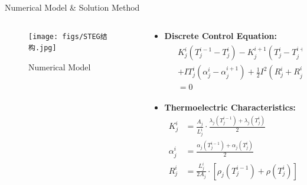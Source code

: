 \documentclass{beamer}
\begin{document}
\begin{frame}{Numerical Model \& Solution Method}
    \begin{columns}
        \begin{column}{.35\textwidth}
            \vfill
            \begin{figure}
                \texttt{[image: figs/STEG结构.jpg]}
                \caption{Numerical Model}
                \label{fig4}
            \end{figure}
        \end{column}
        
        \begin{column}{.7\textwidth}
            \begin{itemize}
                \item \textbf{Discrete Control Equation:}
                {\small
                \begin{align}
                    \begin{aligned}
                        &K_j^i\left( {T_j^{i - 1} - T_j^i} \right) 
                        - K_j^{i + 1}\left( {T_j^i - T_j^{i + 1}} \right) \\ 
                        &+ IT_j^i\left( {\alpha _j^i - \alpha _j^{i + 1}} \right)+ \frac{1}{2}{I^2}\left( {R_j^i + R_j^{i + 1}} \right) \\ 
                        &= 0
                    \end{aligned}
                \end{align}
                }

                \item \textbf{Thermoelectric Characteristics:}
                {\small
                \begin{align}
                    K_j^i &= \frac{A_j}{L_j^i} \cdot \frac{\lambda_j\left(T_j^{i-1}\right) + \lambda_j\left(T_j^i\right)}{2} \\[5pt]
                    \alpha_j^i &= \frac{\alpha_j\left(T_j^{i-1}\right) + \alpha_j\left(T_j^i\right)}{2} \\[5pt]
                    R_j^i &= \frac{L_j^i}{2A_j} \cdot \left[\rho_j\left(T_j^{i-1}\right) + \rho\left(T_j^i\right)\right]
                \end{align}
                }
            
            \end{itemize}
        \end{column}
    \end{columns}
\end{frame}
\end{document}
